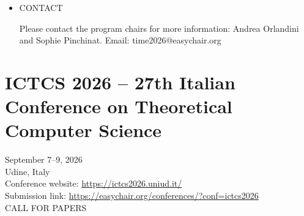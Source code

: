 \documentclass[prodmode,acmtecs]{acmsmall} %
\begin{document}
\begin{itemize}
  We use EasyCshair throughout the submission and selection process. The webpage for submitting papers with all required information can be found here. 
 
  There are three types of submissions, and the authors are invited to specify under which one their paper lies: 
 
\begin{itemize}\item   Original papers (12 pages, excluding references and appendix): such papers describe original, non-published contributions. It includes theoretical (new algorithms, proofs, models) and applied (applications, system descriptions, evaluation) contributions. 
\item  Survey papers (12 pages, excluding references and appendix): such papers are intended to propose a short review of a complete domain of research.
\item  Extended abstracts (4 pages, excluding references and appendix): such abstracts are intended to foster debates during the symposium and include: work-in-progress, project kick-off or review, PhD summary, and summary of a paper accepted in a major conference or journal. They will be specifically mentioned in the proceedings as abstracts and not full papers.
\end{itemize} 
  The proceedings of TIME are planned to be published in the Open Access Series in Informatics (OASIcs). This is a series of high-quality peer-reviewed conference proceedings, and published according to the principle of OpenAccess. 
 
  Finally, the authors of the top-ranked papers will be invited to submit an extended version of their contribution to a special issue in a high ranked journal; more details will be provided in due time. 
 
\item  CONTACT  
 
  Please contact the program chairs for more information: Andrea Orlandini and Sophie Pinchinat. Email: time2026@easychair.org 
 
\end{itemize}\section{ICTCS 2026 – 27th Italian Conference on Theoretical Computer Science}\label{ICTCS202627thItalianConferenceonTheoreticalComputerScience}  September 7–9, 2026\\ 
  Udine, Italy\\ 
  Conference website: \href{https://ictcs2026.uniud.it/}{https://ictcs2026.uniud.it/}\\ 
  Submission link: \href{https://easychair.org/conferences/?conf=ictcs2026}{https://easychair.org/conferences/?conf=ictcs2026}\\ 
CALL FOR PAPERS 
\end{document}
